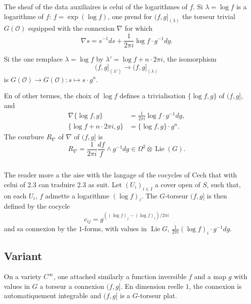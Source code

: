 \documentclass[12pt,a4paper]{article}
\theoremstyle{plain}
\theoremstyle{definition}
\theoremstyle{remark}
\newcommand{\cO}{\mathcal{O}}
\providecommand{\cO}{\mathcal{O}}
\begin{document}
The sheaf of the data auxiliaires is celui of the logarithmes of $f$. Si $\lambda = \log f$
is a logarithme of $f$: $f = \exp(\log f)$, one prend for $(f,g]_{(\lambda)}$ the torseur trivial $G(\cO)$
equipped with the connexion $\nabla$ for which
\[
\nabla s = s^{-1}ds + \frac{1}{2\pi i} \log f \cdot g^{-1}dg.
\]

Si the one remplace $\lambda = \log f$ by $\lambda' = \log f + n \cdot 2\pi i$, the isomorphism
\[
(f,g]_{(\lambda')} \to (f,g]_{(\lambda)}
\]
is $G(\cO) \to G(\cO) : s \mapsto s \cdot g^n$.

En of other termes, the choix of $\log f$ defines a trivialisation $\{\log f, g\}$ of $(f,g]$, and
\begin{align}
\nabla\{\log f, g\} &= \frac{1}{2\pi i} \log f \cdot g^{-1}dg, \label{eq:2.3.1} \\
\{\log f + n \cdot 2\pi i, g\} &= \{\log f, g\} \cdot g^n. \label{eq:2.3.2}
\end{align}
The courbure $R_{\nabla}$ of $\nabla$ of $(f,g]$ is
\begin{equation}\label{eq:2.3.3}
R_{\nabla} = \frac{1}{2\pi i} \frac{df}{f} \wedge g^{-1}dg \in \Omega^2 \otimes \operatorname{Lie}(G).
\end{equation}

\subsection{}

The reader more a the aise with the langage of the cocycles of Cech that with celui
of 2.3 can traduire 2.3 as suit. Let $(U_i)_{i \in I}$ a cover open of $S$, such that, on each $U_i$, $f$ admette a logarithme $(\log f)_i$. The $G$-torseur $(f,g]$ is then
defined by the cocycle
\[
c_{ij} = g^{((\log f)_j - (\log f)_i)/2\pi i}
\]
and sa connexion by the $1$-forms, with values in $\operatorname{Lie} G$, $\frac{1}{2\pi i} (\log f)_i \cdot g^{-1}dg$.

\subsection{Variant}

On a variety $C^\infty$, one attached similarly a function inversible $f$
and a map $g$ with values in $G$ a torseur a connexion $(f,g]$. En dimension
reelle $1$, the connexion is automatiquement integrable and $(f,g]$ is a $G$-torseur plat.

\subsection{}
\end{document}
